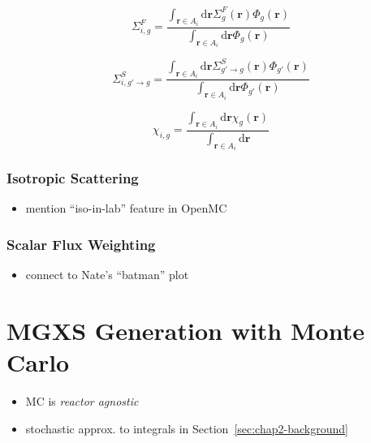 \begin{equation}
\label{eqn:chap2-area-avg-fission-xs}
\Sigma_{i,g}^{F} = \frac{\int_{\mathbf{r}\in A_{i}}\mathrm{d}\mathbf{r}\Sigma_{g}^F(\mathbf{r})\Phi_{g}(\mathbf{r})}{\int_{\mathbf{r}\in A_{i}}\mathrm{d}\mathbf{r}\Phi_{g}(\mathbf{r})}
\end{equation}

\begin{equation}
\label{eqn:chap2-area-avg-scatter-xs}
\Sigma_{i,g'\rightarrow g}^{S} = \frac{\int_{\mathbf{r}\in A_{i}}\mathrm{d}\mathbf{r}\Sigma_{g'\rightarrow g}^S(\mathbf{r})\Phi_{g'}(\mathbf{r})}{\int_{\mathbf{r}\in A_{i}}\mathrm{d}\mathbf{r}\Phi_{g'}(\mathbf{r})}
\end{equation}

\begin{equation}
\label{eqn:chap2-area-avg-chi}
\chi_{i,g} = \frac{\int_{\mathbf{r}\in A_{i}}\mathrm{d}\mathbf{r}\chi_{g}(\mathbf{r})}{\int_{\mathbf{r}\in A_{i}}\mathrm{d}\mathbf{r}}
\end{equation}


\subsubsection{Isotropic Scattering}
\label{subsubsec:chap2-iso-scatter}

\begin{itemize}
  \item mention ``iso-in-lab'' feature in OpenMC
\end{itemize}

\subsubsection{Scalar Flux Weighting}
\label{subsubsec:chap2-const-in-angle}

\begin{itemize}[noitemsep]
  \item connect to Nate's ``batman'' plot
\end{itemize}


\section{MGXS Generation with Monte Carlo}
\label{sec:chap2-mgxs-mc}

\begin{itemize}[noitemsep]
  \item \ac{MC} is \emph{reactor agnostic}
  \item stochastic approx. to integrals in Section~\ref{sec:chap2-background}
\end{itemize}

